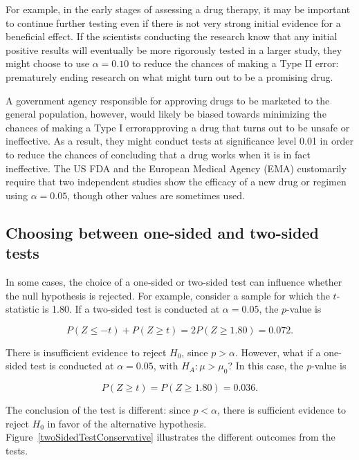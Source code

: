 For example, in the early stages of assessing a drug therapy, it may be important to continue further testing even if there is not very strong initial evidence for a beneficial effect. If the scientists conducting the research know that any initial positive results will eventually be more rigorously tested in a larger study, they might choose to use $\alpha = 0.10$ to reduce the chances of making a Type II error: prematurely ending research on what might turn out to be a promising drug.

A government agency responsible for approving drugs to be marketed to the general population, however, would likely be biased towards minimizing the chances of making a Type I error\textemdash approving a drug that turns out to be unsafe or ineffective. As a result, they might conduct tests at significance level 0.01 in order to reduce the chances of concluding that a drug works when it is in fact ineffective. The US FDA and the European Medical Agency (EMA) customarily require that two independent studies show the efficacy of a new drug or regimen using $\alpha = 0.05$, though other values are sometimes used.


\subsection{Choosing between one-sided and two-sided tests}

In some cases, the choice of a one-sided or two-sided test can influence whether the null hypothesis is rejected. For example, consider a sample for which the $t$-statistic is 1.80. If a two-sided test is conducted at $\alpha = 0.05$, the $p$-value is

\[P(Z \leq -t) + P(Z \geq t)= 2P(Z \geq 1.80) = 0.072.\]

There is insufficient evidence to reject $H_0$, since $p > \alpha$. However, what if a one-sided test is conducted at $\alpha = 0.05$, with $H_A: \mu > \mu_0$? In this case, the $p$-value is

\[P(Z \geq t)= P(Z \geq 1.80) = 0.036.\]

The conclusion of the test is different: since $p < \alpha$, there is sufficient evidence to reject $H_0$ in favor of the alternative hypothesis. Figure~\ref{twoSidedTestConservative} illustrates the different outcomes from the tests.

